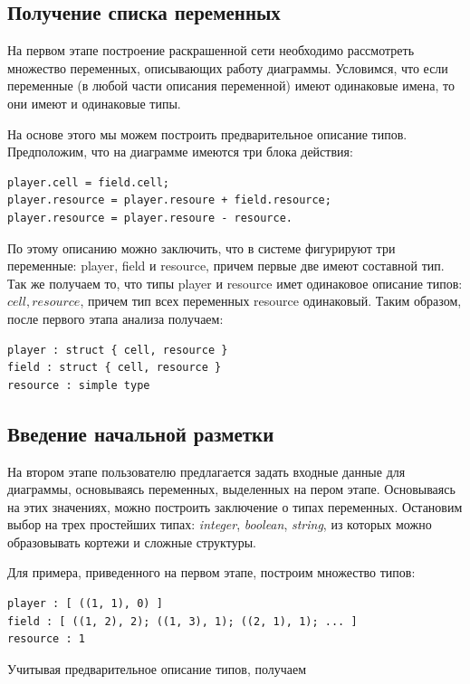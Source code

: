 \subsection{Получение списка переменных}

На первом этапе построение раскрашенной сети необходимо рассмотреть множество переменных, описывающих работу диаграммы. Условимся, что если переменные (в любой части описания переменной) имеют одинаковые имена, то они имеют и одинаковые типы.

На основе этого мы можем построить предварительное описание типов. Предположим, что на диаграмме имеются три блока действия:
\begin{verbatim}
player.cell = field.cell;
player.resource = player.resoure + field.resource;
player.resource = player.resoure - resource.
\end{verbatim}

По этому описанию можно заключить, что в системе фигурируют три переменные: player, field и resource, причем первые две имеют составной тип. Так же получаем то, что типы player и resource имет одинаковое описание типов: $ { cell, resource } $, причем тип всех переменных resource одинаковый. Таким образом, после первого этапа анализа получаем:

\begin{verbatim}
player : struct { cell, resource }
field : struct { cell, resource }
resource : simple type
\end{verbatim}

\subsection{Введение начальной разметки}

На втором этапе пользователю предлагается задать входные данные для диаграммы, основываясь переменных, выделенных на пером этапе. Основываясь на этих значениях, можно построить заключение о типах переменных. Остановим выбор на трех простейших типах: \textit{integer}, \textit{boolean}, \textit{string}, из которых можно образовывать кортежи и сложные структуры.

Для примера, приведенного на первом этапе, построим множество типов:

\begin{verbatim}
player : [ ((1, 1), 0) ]
field : [ ((1, 2), 2); ((1, 3), 1); ((2, 1), 1); ... ]
resource : 1
\end{verbatim}

Учитывая предварительное описание типов, получаем

